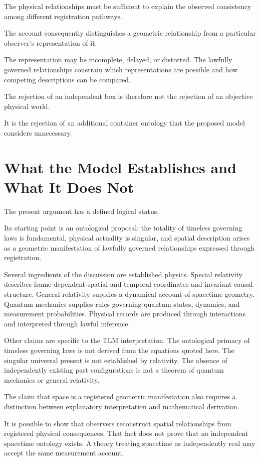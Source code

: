 \documentclass[12pt,onecolumn]{article}
\begin{document}
The physical relationships must be sufficient to explain the observed consistency among different registration pathways.

The account consequently distinguishes a geometric relationship from a particular observer's representation of it.

The representation may be incomplete, delayed, or distorted. The lawfully governed relationships constrain which representations are possible and how competing descriptions can be compared.

The rejection of an independent box is therefore not the rejection of an objective physical world.

It is the rejection of an additional container ontology that the proposed model considers unnecessary.

\section{What the Model Establishes and What It Does Not}

The present argument has a defined logical status.

Its starting point is an ontological proposal: the totality of timeless governing laws is fundamental, physical actuality is singular, and spatial description arises as a geometric manifestation of lawfully governed relationships expressed through registration.

Several ingredients of the discussion are established physics. Special relativity describes frame-dependent spatial and temporal coordinates and invariant causal structure. General relativity supplies a dynamical account of spacetime geometry. Quantum mechanics supplies rules governing quantum states, dynamics, and measurement probabilities. Physical records are produced through interactions and interpreted through lawful inference.

Other claims are specific to the TLM interpretation. The ontological primacy of timeless governing laws is not derived from the equations quoted here. The singular universal present is not established by relativity. The absence of independently existing past configurations is not a theorem of quantum mechanics or general relativity.

The claim that space is a registered geometric manifestation also requires a distinction between explanatory interpretation and mathematical derivation.

It is possible to show that observers reconstruct spatial relationships from registered physical consequences. That fact does not prove that no independent spacetime ontology exists. A theory treating spacetime as independently real may accept the same measurement account.
\end{document}

